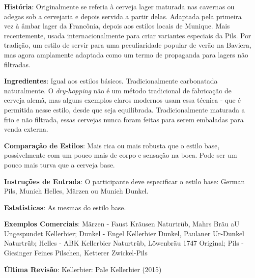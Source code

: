 \textbf{História}: Originalmente se referia à cerveja lager maturada nas cavernas ou adegas sob a cervejaria e depois servida a partir delas. Adaptada pela primeira vez à âmbar lager da Francônia, depois aos estilos locais de Munique. Mais recentemente, usada internacionalmente para criar variantes especiais da Pils. Por tradição, um estilo de servir para uma peculiaridade popular de verão na Baviera, mas agora amplamente adaptada como um termo de propaganda para lagers não filtradas.

\textbf{Ingredientes}: Igual aos estilos básicos. Tradicionalmente carbonatada naturalmente. O \textit{dry-hopping} não é um método tradicional de fabricação de cerveja alemã, mas alguns exemplos claros modernos usam essa técnica - que é permitida nesse estilo, desde que seja equilibrada. Tradicionalmente maturada a frio e não filtrada, essas cervejas nunca foram feitas para serem embaladas para venda externa.

\textbf{Comparação de Estilos}: Mais rica ou mais robusta que o estilo base, possivelmente com um pouco mais de corpo e sensação na boca. Pode ser um pouco mais turva que a cerveja base.

\textbf{Instruções de Entrada}: O participante deve especificar o estilo base: German Pils, Munich Helles, Märzen ou Munich Dunkel.

\textbf{Estatisticas}: As mesmas do estilo base.

\textbf{Exemplos Comerciais}: Märzen - Faust Kräusen Naturtrüb, Mahrs Bräu aU Ungespundet Kellerbier; Dunkel - Engel Kellerbier Dunkel, Paulaner Ur-Dunkel Naturtrüb; Helles - ABK Kellerbier Naturtrüb, Löwenbräu 1747 Original; Pils - Giesinger Feines Pilschen, Ketterer Zwickel-Pils

\textbf{Última Revisão}: Kellerbier: Pale Kellerbier (2015)

